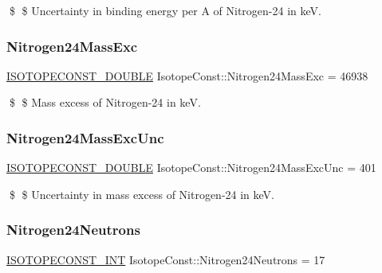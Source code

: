 \$ \$ Uncertainty in binding energy per A of Nitrogen-\/24 in keV. \mbox{\label{group___isotope_const-_nitrogen-_n24_gaf382544264edbb77754e1dc18bf31c95}} 
\subsubsection{\texorpdfstring{Nitrogen24\+Mass\+Exc}{Nitrogen24MassExc}}
{\footnotesize\ttfamily \mbox{\hyperlink{group___isotope_const-_macros_ga8f45a7272ce02c0b4c65c44636ed719a}{I\+S\+O\+T\+O\+P\+E\+C\+O\+N\+S\+T\+\_\+\+D\+O\+U\+B\+LE}} Isotope\+Const\+::\+Nitrogen24\+Mass\+Exc = 46938}

\$ \$ Mass excess of Nitrogen-\/24 in keV. \mbox{\label{group___isotope_const-_nitrogen-_n24_gadd322a1a4f1afbfef17346be33cc3e96}} 
\subsubsection{\texorpdfstring{Nitrogen24\+Mass\+Exc\+Unc}{Nitrogen24MassExcUnc}}
{\footnotesize\ttfamily \mbox{\hyperlink{group___isotope_const-_macros_ga8f45a7272ce02c0b4c65c44636ed719a}{I\+S\+O\+T\+O\+P\+E\+C\+O\+N\+S\+T\+\_\+\+D\+O\+U\+B\+LE}} Isotope\+Const\+::\+Nitrogen24\+Mass\+Exc\+Unc = 401}

\$ \$ Uncertainty in mass excess of Nitrogen-\/24 in keV. \mbox{\label{group___isotope_const-_nitrogen-_n24_ga29583bff83b8fe3313426c84141e1d6c}} 
\subsubsection{\texorpdfstring{Nitrogen24\+Neutrons}{Nitrogen24Neutrons}}
{\footnotesize\ttfamily \mbox{\hyperlink{group___isotope_const-_macros_ga5f18360b3e99483a35c32d789e62621c}{I\+S\+O\+T\+O\+P\+E\+C\+O\+N\+S\+T\+\_\+\+I\+NT}} Isotope\+Const\+::\+Nitrogen24\+Neutrons = 17}

